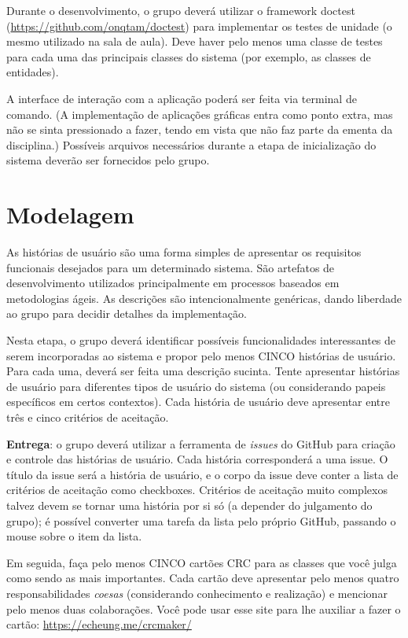 \documentclass[11pt]{article}
\begin{document}
Durante o desenvolvimento, o grupo deverá utilizar o framework doctest
(\url{https://github.com/onqtam/doctest}) para implementar os testes de
unidade (o mesmo utilizado na sala de aula). Deve haver pelo menos uma
classe de testes para cada uma das principais classes do sistema (por
exemplo, as classes de entidades).

A interface de interação com a aplicação poderá ser feita via terminal
de comando. (A implementação de aplicações gráficas entra como ponto
extra, mas não se sinta pressionado a fazer, tendo em vista que não
faz parte da ementa da disciplina.) Possíveis arquivos necessários
durante a etapa de inicialização do sistema deverão ser fornecidos
pelo grupo.
\section{Modelagem}
\label{sec:org587998b}

As histórias de usuário são uma forma simples de apresentar os requisitos
funcionais desejados para um determinado sistema. São artefatos de
desenvolvimento utilizados principalmente em processos baseados em
metodologias ágeis. As descrições são intencionalmente genéricas,
dando liberdade ao grupo para decidir detalhes da implementação.

Nesta etapa, o grupo deverá identificar possíveis funcionalidades
interessantes de serem incorporadas ao sistema e propor pelo menos
CINCO histórias de usuário. Para cada uma, deverá ser feita uma
descrição sucinta. Tente apresentar histórias de usuário para
diferentes tipos de usuário do sistema (ou considerando papeis
específicos em certos contextos). Cada história de usuário deve
apresentar entre três e cinco critérios de aceitação.

\textbf{Entrega}: o grupo deverá utilizar a ferramenta de \emph{issues} do GitHub para
criação e controle das histórias de usuário. Cada história
corresponderá a uma issue. O título da issue será a história de
usuário, e o corpo da issue deve conter a lista de critérios de
aceitação como checkboxes. Critérios de aceitação muito complexos
talvez devem se tornar uma história por si só (a depender do
julgamento do grupo); é possível converter uma tarefa da lista pelo
próprio GitHub, passando o mouse sobre o item da lista.

Em seguida, faça pelo menos CINCO cartões CRC para as classes que você
julga como sendo as mais importantes. Cada cartão deve
apresentar pelo menos quatro responsabilidades \emph{coesas} (considerando
conhecimento e realização) e mencionar pelo menos duas
colaborações. Você pode usar esse site para lhe auxiliar a fazer o
cartão: \url{https://echeung.me/crcmaker/}
\end{document}

